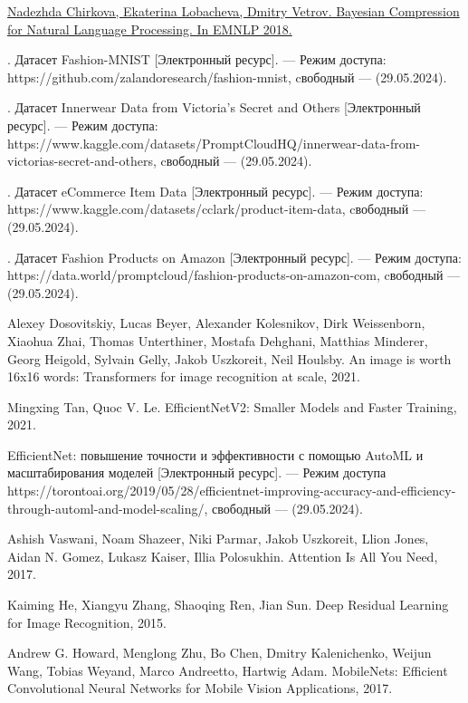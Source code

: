 \newpage 
\printbibliography[heading=bibintoc] 

\begin{thebibliography}{0}
	\hypertarget{chirkova18}{}
	\href{https://arxiv.org/abs/1810.10927}
	{Nadezhda Chirkova, Ekaterina Lobacheva, Dmitry Vetrov. Bayesian Compression for Natural Language Processing. In EMNLP 2018.}
	
	. Датасет Fashion-MNIST [Электронный ресурс]. — Режим доступа: https://github.com/zalandoresearch/fashion-mnist, cвободный — (29.05.2024).
	
	. Датасет Innerwear Data from Victoria's Secret and Others [Электронный ресурс]. — Режим доступа: https://www.kaggle.com/datasets/PromptCloudHQ/innerwear-data-from-victorias-secret-and-others, cвободный — (29.05.2024).
	
	. Датасет eCommerce Item Data [Электронный ресурс]. — Режим доступа: https://www.kaggle.com/datasets/cclark/product-item-data, cвободный — (29.05.2024).
	
	. Датасет Fashion Products on Amazon [Электронный ресурс]. — Режим доступа: https://data.world/promptcloud/fashion-products-on-amazon-com, cвободный — (29.05.2024).
	
	Alexey Dosovitskiy, Lucas Beyer, Alexander Kolesnikov, Dirk Weissenborn, Xiaohua Zhai, Thomas Unterthiner, Mostafa Dehghani, Matthias Minderer,
	Georg Heigold, Sylvain Gelly, Jakob Uszkoreit, Neil Houlsby. An image is worth 16x16 words: Transformers for image recognition at scale, 2021.
	
	Mingxing Tan, Quoc V. Le. EfficientNetV2: Smaller Models and Faster Training, 2021.
	
	EfficientNet: повышение точности и эффективности с помощью AutoML и масштабирования моделей [Электронный ресурс]. — Режим доступа https://torontoai.org/2019/05/28/efficientnet-improving-accuracy-and-efficiency-through-automl-and-model-scaling/, свободный — (29.05.2024).
	
	
	Ashish Vaswani, Noam Shazeer, Niki Parmar, Jakob Uszkoreit, Llion Jones, Aidan N. Gomez, Lukasz Kaiser, Illia Polosukhin. Attention Is All You Need, 2017.
	
	Kaiming He, Xiangyu Zhang, Shaoqing Ren, Jian Sun. Deep Residual Learning for Image Recognition, 2015.
	
	Andrew G. Howard, Menglong Zhu, Bo Chen, Dmitry Kalenichenko, Weijun Wang, Tobias Weyand, Marco Andreetto, Hartwig Adam. MobileNets: Efficient Convolutional Neural Networks for Mobile Vision Applications, 2017.
	

\end{thebibliography}
